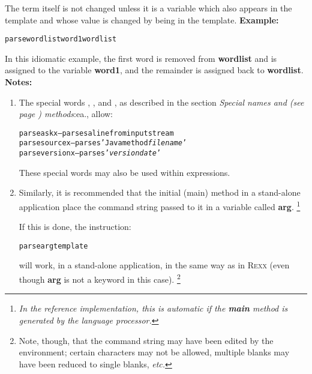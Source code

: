 The term itself is not changed unless it is a variable which also
appears in the template and whose value is changed by being in the
template.
 \textbf{Example:}
\begin{alltt}
parse wordlist word1 wordlist
\end{alltt}
In this idiomatic example, the first word is removed
from \textbf{wordlist} and is assigned to the
variable \textbf{word1}, and the remainder is assigned back
to \textbf{wordlist}.
 \textbf{Notes:}
\begin{enumerate}
\item 
The special words , , and ,
as described in the section  \emph{Special names and (see page \pageref{refspecial}) 
methods}:ea., allow:
\begin{alltt}
parse ask x     -- parses a line from input stream
parse source x  -- parses 'Java method \emph{filename}'
parse version x -- parses '\nr{} \emph{version} \emph{date}'
\end{alltt}
These special words may also be used within expressions.
\item 
Similarly, it is recommended that the initial (main) method in a
stand-alone application place the command string passed to it in a
variable called \textbf{arg}.
\footnote{
\emph{In the reference implementation, this is automatic if
the \textbf{main} method is generated by the \nr{} language
processor.}
}
 
If this is done, the instruction:
\begin{alltt}
parse arg template
\end{alltt}
will work, in a stand-alone application, in the same way as in R\textsc{exx}
(even though \textbf{arg} is not a keyword in this case).
\footnote{
Note, though, that the command string may have been edited by the
environment; certain characters may not be allowed, multiple blanks may
have been reduced to single blanks, \emph{etc.}
}
\end{enumerate}
